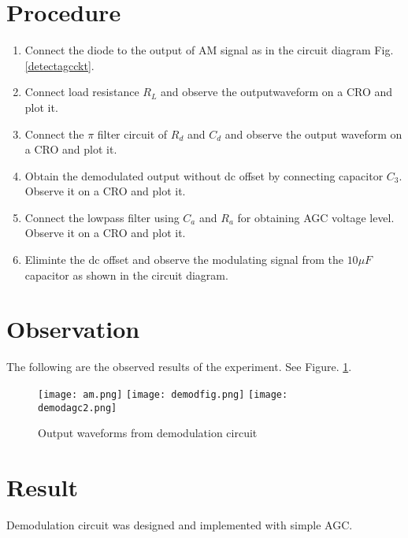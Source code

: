 \section*{Procedure}
\begin{enumerate}
\item
{Connect the diode to the output of AM signal as in the circuit diagram Fig. \ref{detectagcckt}.}
\item
Connect load resistance $R_L$ and observe the outputwaveform on a CRO and plot it.
\item
Connect the $\pi$ filter circuit of $R_d$ and $C_d$ and observe the output waveform on a CRO and plot it.
\item
Obtain the demodulated output without dc offset by connecting capacitor $C_3$. Observe it on a CRO and plot it.
\item
Connect the lowpass filter using $C_a$ and $R_a$ for obtaining AGC voltage level. Observe it on a CRO and plot it.
\item
Eliminte the dc offset and observe the modulating signal from the $10\mu F$ capacitor as shown in the circuit diagram.
\end{enumerate}
\section*{Observation}
The following are the observed results of the experiment. See Figure. \ref{demodagcwaves}.
\begin{figure}
\texttt{[image: am.png]}
\texttt{[image: demodfig.png]}
\texttt{[image: demodagc2.png]}
\caption{Output waveforms from demodulation circuit}
\label{demodagcwaves}
\end{figure}

\section*{Result}

Demodulation circuit was designed and implemented with simple AGC.
